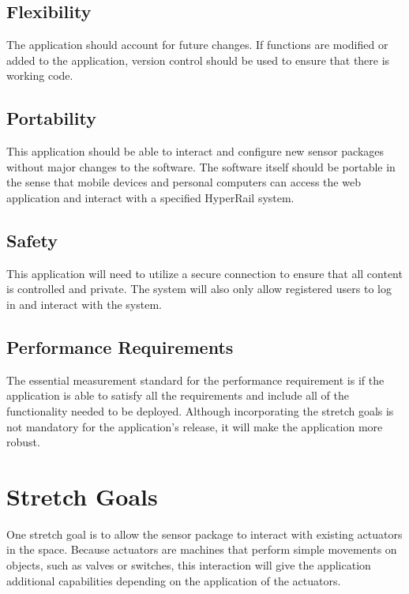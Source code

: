 \documentclass[onecolumn, draftclsnofoot,10pt, compsoc]{IEEEtran}
\begin{document}
\subsection{Flexibility}
The application should account for future changes. If functions are modified or added to the application, version control should be used to ensure that there is working code.

\subsection{Portability}
This application should be able to interact and configure new sensor packages without major changes to the software. The software itself should be portable in the sense that mobile devices and personal computers can access the web application and interact with a specified HyperRail system. %

\subsection{Safety}
This application will need to utilize a secure connection to ensure that all content is controlled and private. The system will also only allow registered users to log in and interact with the system.


\subsection{Performance Requirements}
The essential measurement standard for the performance requirement is if the application is able to satisfy all the requirements and include all of the functionality needed to be deployed. Although incorporating the stretch goals is not mandatory for the application's release, it will make the application more robust. %


\section{Stretch Goals}
One stretch goal is to allow the sensor package to interact with existing actuators in the space. Because actuators are machines that perform simple movements on objects, such as valves or switches, this interaction will give the application additional capabilities depending on the application of the actuators.
\end{document}
